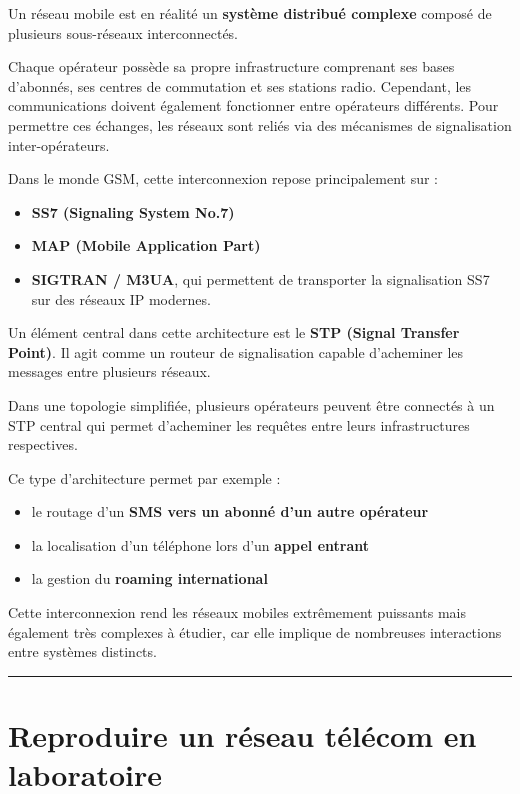 \documentclass[
  french,
]{article}
\providecommand{\tightlist}{%
  \setlength{\itemsep}{0pt}\setlength{\parskip}{0pt}}
\begin{document}
Un réseau mobile est en réalité un \textbf{système distribué complexe}
composé de plusieurs sous-réseaux interconnectés.

Chaque opérateur possède sa propre infrastructure comprenant ses bases
d'abonnés, ses centres de commutation et ses stations radio. Cependant,
les communications doivent également fonctionner entre opérateurs
différents. Pour permettre ces échanges, les réseaux sont reliés via des
mécanismes de signalisation inter-opérateurs.

Dans le monde GSM, cette interconnexion repose principalement sur :

\begin{itemize}
\tightlist
\item
  \textbf{SS7 (Signaling System No.7)}
\item
  \textbf{MAP (Mobile Application Part)}
\item
  \textbf{SIGTRAN / M3UA}, qui permettent de transporter la
  signalisation SS7 sur des réseaux IP modernes.
\end{itemize}

Un élément central dans cette architecture est le \textbf{STP (Signal
Transfer Point)}. Il agit comme un routeur de signalisation capable
d'acheminer les messages entre plusieurs réseaux.

Dans une topologie simplifiée, plusieurs opérateurs peuvent être
connectés à un STP central qui permet d'acheminer les requêtes entre
leurs infrastructures respectives.

Ce type d'architecture permet par exemple :

\begin{itemize}
\tightlist
\item
  le routage d'un \textbf{SMS vers un abonné d'un autre opérateur}
\item
  la localisation d'un téléphone lors d'un \textbf{appel entrant}
\item
  la gestion du \textbf{roaming international}
\end{itemize}

Cette interconnexion rend les réseaux mobiles extrêmement puissants mais
également très complexes à étudier, car elle implique de nombreuses
interactions entre systèmes distincts.

\begin{center}\rule{0.5\linewidth}{0.5pt}\end{center}

\section{Reproduire un réseau télécom en
laboratoire}\label{reproduire-un-ruxe9seau-tuxe9luxe9com-en-laboratoire}
\end{document}
